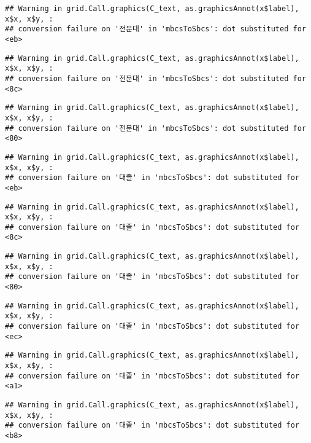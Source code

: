 \documentclass[
]{article}
\begin{document}
\begin{verbatim}
## Warning in grid.Call.graphics(C_text, as.graphicsAnnot(x$label), x$x, x$y, :
## conversion failure on '전문대' in 'mbcsToSbcs': dot substituted for <eb>
\end{verbatim}

\begin{verbatim}
## Warning in grid.Call.graphics(C_text, as.graphicsAnnot(x$label), x$x, x$y, :
## conversion failure on '전문대' in 'mbcsToSbcs': dot substituted for <8c>
\end{verbatim}

\begin{verbatim}
## Warning in grid.Call.graphics(C_text, as.graphicsAnnot(x$label), x$x, x$y, :
## conversion failure on '전문대' in 'mbcsToSbcs': dot substituted for <80>
\end{verbatim}

\begin{verbatim}
## Warning in grid.Call.graphics(C_text, as.graphicsAnnot(x$label), x$x, x$y, :
## conversion failure on '대졸' in 'mbcsToSbcs': dot substituted for <eb>
\end{verbatim}

\begin{verbatim}
## Warning in grid.Call.graphics(C_text, as.graphicsAnnot(x$label), x$x, x$y, :
## conversion failure on '대졸' in 'mbcsToSbcs': dot substituted for <8c>
\end{verbatim}

\begin{verbatim}
## Warning in grid.Call.graphics(C_text, as.graphicsAnnot(x$label), x$x, x$y, :
## conversion failure on '대졸' in 'mbcsToSbcs': dot substituted for <80>
\end{verbatim}

\begin{verbatim}
## Warning in grid.Call.graphics(C_text, as.graphicsAnnot(x$label), x$x, x$y, :
## conversion failure on '대졸' in 'mbcsToSbcs': dot substituted for <ec>
\end{verbatim}

\begin{verbatim}
## Warning in grid.Call.graphics(C_text, as.graphicsAnnot(x$label), x$x, x$y, :
## conversion failure on '대졸' in 'mbcsToSbcs': dot substituted for <a1>
\end{verbatim}

\begin{verbatim}
## Warning in grid.Call.graphics(C_text, as.graphicsAnnot(x$label), x$x, x$y, :
## conversion failure on '대졸' in 'mbcsToSbcs': dot substituted for <b8>
\end{verbatim}
\end{document}
